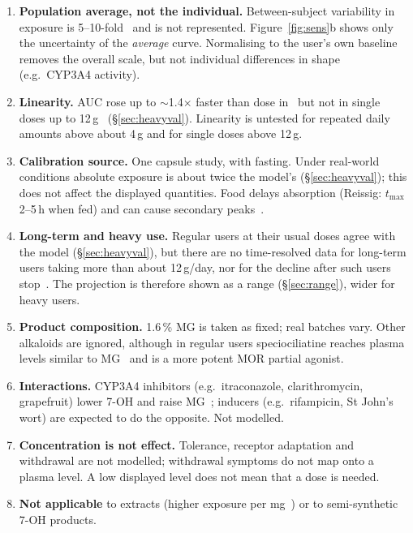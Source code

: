 \documentclass[10pt,a4paper]{article}
\begin{document}
\begin{enumerate}
\item \textbf{Population average, not the individual.} Between-subject variability in exposure is 5--10-fold~\cite{huestis2024}
and is not represented. Figure~\ref{fig:sens}b shows only the uncertainty of the \emph{average} curve. Normalising to the user's own
baseline removes the overall scale, but not individual differences in shape (e.g.\ CYP3A4 activity).
\item \textbf{Linearity.} AUC rose up to $\sim$1.4$\times$ faster than dose in~\cite{huestis2024,huestis2026} but not in single doses up to
12\,g~\cite{reissig2026} (\S\ref{sec:heavyval}). Linearity is untested for repeated daily amounts above about 4\,g and for single doses
above 12\,g.
\item \textbf{Calibration source.} One capsule study, with fasting. Under real-world conditions absolute exposure is about twice the model's
(\S\ref{sec:heavyval}); this does not affect the displayed quantities. Food delays absorption (Reissig: $t_{\max}$ 2--5\,h when fed) and can
cause secondary peaks~\cite{huestis2024}.
\item \textbf{Long-term and heavy use.} Regular users at their usual doses agree with the model (\S\ref{sec:heavyval}), but there are no
time-resolved data for long-term users taking more than about 12\,g/day, nor for the decline after such users stop~\cite{nct06089980}.
The projection is therefore shown as a range (\S\ref{sec:range}), wider for heavy users.
\item \textbf{Product composition.} 1.6\,\% MG is taken as fixed; real batches vary. Other alkaloids are ignored, although in regular users
speciociliatine reaches plasma levels similar to MG~\cite{smith2024} and is a more potent MOR partial agonist.
\item \textbf{Interactions.} CYP3A4 inhibitors (e.g.\ itraconazole, clarithromycin, grapefruit) lower 7-OH and raise MG~\cite{mongar2024};
inducers (e.g.\ rifampicin, St John's wort) are expected to do the opposite. Not modelled.
\item \textbf{Concentration is not effect.} Tolerance, receptor adaptation and withdrawal are not modelled; withdrawal symptoms do
not map onto a plasma level. A low displayed level does not mean that a dose is needed.
\item \textbf{Not applicable} to extracts (higher exposure per mg~\cite{huestis2026}) or to semi-synthetic 7-OH products.
\end{enumerate}
\end{document}
